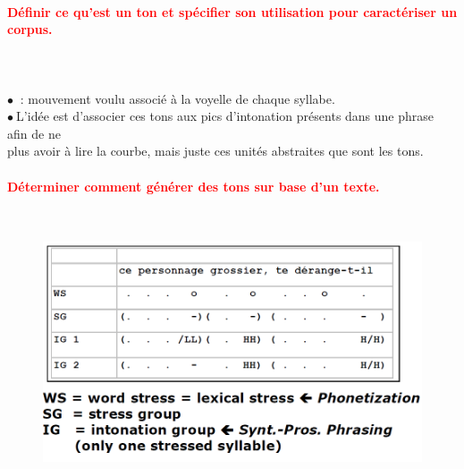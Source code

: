 \documentclass[letterpaper, 12pt]{article}
\newcommand{\alinea}{
\hspace*{0.3cm}}
\newcommand{\red}[1]{
	\textcolor{red}{#1}
}
\newcommand{\myul}[1]{
	\underline{\smash{#1}}
}
\newcommand{\point}{$\bullet\ $}
\begin{document}
		\paragraph{\red{Définir ce qu'est un ton et spécifier son utilisation pour caractériser un corpus.}}~\\~\\
			\point \myul{Ton}: mouvement voulu associé à la voyelle de chaque syllabe.\\
			\point L'idée est d'associer ces tons aux pics d'intonation présents dans une phrase afin de ne 
				\\\alinea plus avoir à lire la courbe, mais juste ces unités abstraites que sont les tons.
		\paragraph{\red{Déterminer comment générer des tons sur base d'un texte.}}~\\
			\begin{figure}[H]
				\centering
				\includegraphics[scale=0.425]{Images/tones}
			\end{figure}\noindent
\end{document}

